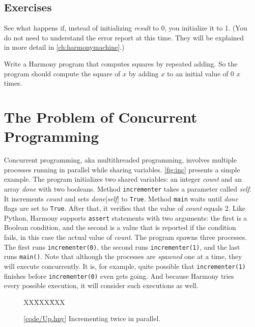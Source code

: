 \documentclass{report}
\newcommand{\harmonysource}[1]{
\begin{tabbing}
XX\=XXX\=XXX\kill
    
\end{tabbing}
}
\newcommand{\harmonylink}[1]{%
[\href{https://www.cs.cornell.edu/home/rvr/harmony/#1}{\underline{#1}}]%
}
\newenvironment{code}{
\tcolorbox
}{
\endtcolorbox
}
\begin{document}
\section*{Exercises}
\begin{problems}
\item See what happens if, instead of initializing \textit{result} to 0,
you initialize it to 1.  (You do not need to understand the error report at this time.  They will be explained in more detail in \autoref{ch:harmonymachine}.)
\item Write a Harmony program that computes squares by repeated adding.  So the program
should compute the square of $x$ by adding $x$ to an initial value of 0 $x$ times.
\end{problems}

\chapter{The Problem of Concurrent Programming}
\label{ch:concurrent}

%

Concurrent programming, aka multithreaded programming, involves multiple
processes
%
running in parallel while sharing variables.
\autoref{fig:inc} presents a simple example.
The program
initializes two shared variables: an integer \textit{count} and
an array \textit{done} with two booleans.
Method \texttt{incrementer} takes a parameter called \textit{self}.
It increments \textit{count} and sets \textit{done}[\textit{self}] to \texttt{True}.
Method \texttt{main} waits until \textit{done} flags are set to \texttt{True}.
After that, it verifies that the value of \textit{count} equals 2.
Like Python, Harmony supports \texttt{assert} statements with two arguments:
the first is a Boolean condition, and the second is a value that is
reported if the condition fails, in this case
the actual value of \textit{count}.
The program spawns three processes.
The first runs \texttt{incrementer(0)}, the second runs
\texttt{incrementer(1)}, and the last runs \texttt{main()}.
Note that although the processes are \emph{spawned} one at a time,
they will execute concurrently.  It is, for example, quite possible
that \texttt{incrementer(1)} finishes before \texttt{incrementer(0)}
even gets going.
And because Harmony tries every possible execution, it will consider
such executions as well.

\begin{figure}[h]
\begin{code}
\harmonysource{Up}
\end{code}
\caption{\harmonylink{code/Up.hny} Incrementing twice in parallel.}
\label{fig:inc}
\end{figure}
\end{document}
